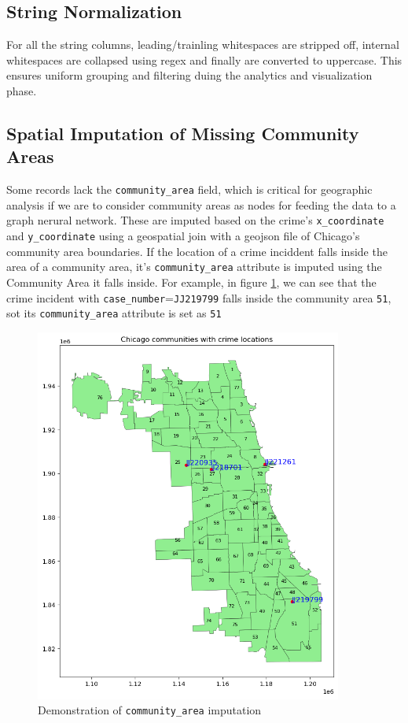 \documentclass[12pt]{article}
\begin{document}
\subsection*{String Normalization}
For all the string columns, leading/trainling whitespaces are stripped off, internal whitespaces are collapsed using regex and finally are converted to uppercase. This ensures uniform grouping and filtering duing the analytics and visualization phase. 

\subsection*{Spatial Imputation of Missing Community Areas}
Some records lack the \texttt{community\_area} field, which is critical for geographic analysis if we are to consider community areas as nodes for feeding the data to a graph nerural network. These are imputed based on the crime's \texttt{x\_coordinate} and \texttt{y\_coordinate} using a geospatial join with a geojson file of Chicago’s community area boundaries. If the location of a crime inciddent falls inside the area of a community area, it's \texttt{community\_area} attribute is imputed using the Community Area it falls inside. For example, in figure \ref{fig:imputation_example}, we can see that the crime incident with \texttt{case\_number}=\texttt{JJ219799} falls inside the community area \texttt{51}, sot its \texttt{community\_area} attribute is set as \texttt{51} 

\begin{figure}[h!]
    \centering
    \includegraphics[width=0.9\textwidth]{figures/imputation_example.png}
    \caption{Demonstration of \texttt{community\_area} imputation}
    \label{fig:imputation_example}
\end{figure}
\end{document}
